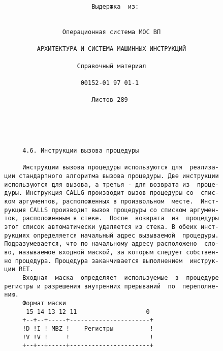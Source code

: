 \begin{verbatim}
                          Выдержка  из:


                  Операционная система МОС ВП

           АРХИТЕКТУРА И СИСТЕМА МАШИННЫХ ИНСТРУКЦИЙ

                      Справочный материал

                       00152-01 97 01-1

                          Листов 289





       4.6. Инструкции вызова процедуры

       Инструкции вызова процедуры используются для  реализа-
  ции стандартного алгоритма вызова процедуры. Две инструкции
  используются для вызова, а третья - для возврата из  проце-
  дуры. Инструкция CALLG производит вызов процедуры со  спис-
  ком аргументов, расположенных в произвольном  месте.  Инст-
  рукция CALLS производит вызов процедуры со списком аргумен-
  тов, расположенным в стеке.  После  возврата  из  процедуры
  этот список автоматически удаляется из стека. В обеих инст-
  рукциях определяется начальный адрес вызываемой  процедуры.
  Подразумевается, что по начальному адресу расположено  сло-
  во, называемое входной маской, за которым следует собствен-
  но процедура. Процедура заканчивается выполнением  инструк-
  ции RET.
       Входная  маска  определяет  используемые  в  процедуре
  регистры и разрешения внутренних прерываний  по  переполне-
  нию.
       Формат маски
        15 14 13 12 11                   0
       +--+--+-----+----------------------+
       !D !I ! MBZ !    Регистры          !
       !V !V !     !                      !
       +--+--+-----+----------------------+


\end{verbatim}
